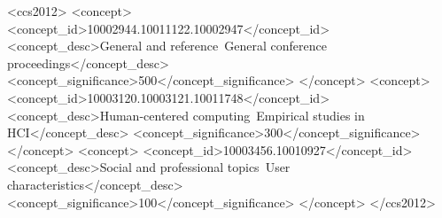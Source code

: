 \documentclass{sig-alternate}
\begin{document}
\begin{CCSXML}
<ccs2012>
<concept>
<concept_id>10002944.10011122.10002947</concept_id>
<concept_desc>General and reference~General conference proceedings</concept_desc>
<concept_significance>500</concept_significance>
</concept>
<concept>
<concept_id>10003120.10003121.10011748</concept_id>
<concept_desc>Human-centered computing~Empirical studies in HCI</concept_desc>
<concept_significance>300</concept_significance>
</concept>
<concept>
<concept_id>10003456.10010927</concept_id>
<concept_desc>Social and professional topics~User characteristics</concept_desc>
<concept_significance>100</concept_significance>
</concept>
</ccs2012>
\end{CCSXML}


%
%

%
%
\printccsdesc


\end{document}
